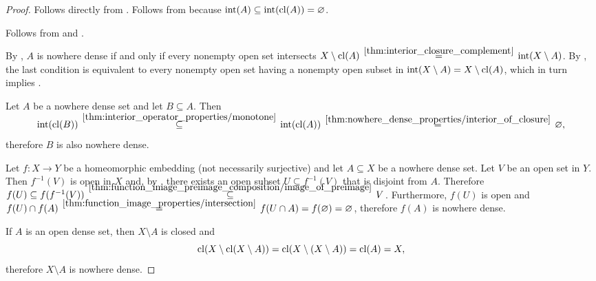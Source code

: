 \begin{proof}
   Follows directly from .
   Follows from  because \( \operatorname{int}(A) \subseteq \operatorname{int}(\operatorname{cl}(A)) = \varnothing \).

   Follows from  and .

   By , \( A \) is nowhere dense if and only if every nonempty open set intersects \( X \setminus \cl(A) \reloset {\ref{thm:interior_closure_complement}} = \inter(X \setminus A) \). By , the last condition is equivalent to every nonempty open set having a nonempty open subset in \( \operatorname{int}(X \setminus A) = X \setminus \operatorname{cl}(A) \), which in turn implies .

   Let \( A \) be a nowhere dense set and let \( B \subseteq A \). Then
  \begin{equation*}
    \inter(\cl(B))
    \reloset {\ref{thm:interior_operator_properties/monotone}} \subseteq
    \inter(\cl(A))
    \reloset {\ref{thm:nowhere_dense_properties/interior_of_closure}} =
    \varnothing,
  \end{equation*}
  therefore \( B \) is also nowhere dense.

   Let \( f: X \to Y \) be a homeomorphic embedding (not necessarily surjective) and let \( A \subseteq X \) be a nowhere dense set. Let \( V \) be an open set in \( Y \). Then \( f^{-1}(V) \) is open in \( X \) and, by , there exists an open subset \( U \subseteq f^{-1}(V) \) that is disjoint from \( A \). Therefore \( f(U) \subseteq f(f^{-1}(V)) \reloset {\ref{thm:function_image_preimage_composition/image_of_preimage}} \subseteq V \). Furthermore, \( f(U) \) is open and \( f(U) \cap f(A) \reloset {\ref{thm:function_image_properties/intersection}} = f(U \cap A) = f(\varnothing) = \varnothing \), therefore \( f(A) \) is nowhere dense.

   If \( A \) is an open dense set, then \( X \setminus A \) is closed and
  \begin{equation*}
    \operatorname{cl}(X \setminus \operatorname{cl}(X \setminus A))
    =
    \operatorname{cl}(X \setminus (X \setminus A))
    =
    \operatorname{cl}(A)
    =
    X,
  \end{equation*}
  therefore \( X \setminus A \) is nowhere dense.
\end{proof}

